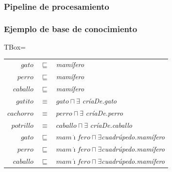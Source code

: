 \documentclass[compress,xcolor=dvipsnames]{beamer}
\theoremstyle{definition}
\begin{document}
\begin{frame}
	\frametitle{Pipeline de procesamiento}
		\begin{center}
	\end{center}
\end{frame}

\begin{frame}
\frametitle{Ejemplo de base de conocimiento}
TBox=
	\begin{center}
		\begin{tabular}{rll}
			$gato$ & $\sqsubseteq$ & \textit{mamífero} \\
			$perro$ & $\sqsubseteq$ &\textit{mamífero} \\
			$caballo$ & $\sqsubseteq$ & \textit{mamífero} \\
			$gatito$ & $\equiv$ & $gato\sqcap\exists $ \textit{críaDe.gato}\\
			$cachorro$ & $\equiv$ & $perro\sqcap\exists $ \textit{críaDe.perro}\\
			$potrillo$ & $\equiv$ & $caballo\sqcap\exists $ \textit{críaDe.caballo}\\
			$gato$ & $\sqsubseteq$ & $mam\acute{\imath}fero\sqcap\exists $\textit{cuadrúpedo.mamífero}\\
			$perro$ & $\sqsubseteq$ & $mam\acute{\imath}fero\sqcap\exists $\textit{cuadrúpedo.mamífero}\\
			$caballo$ & $\sqsubseteq$ & $mam\acute{\imath}fero\sqcap\exists $\textit{cuadrúpedo.mamífero}\\
		\end{tabular}
	\end{center}
\end{frame}
\end{document}
